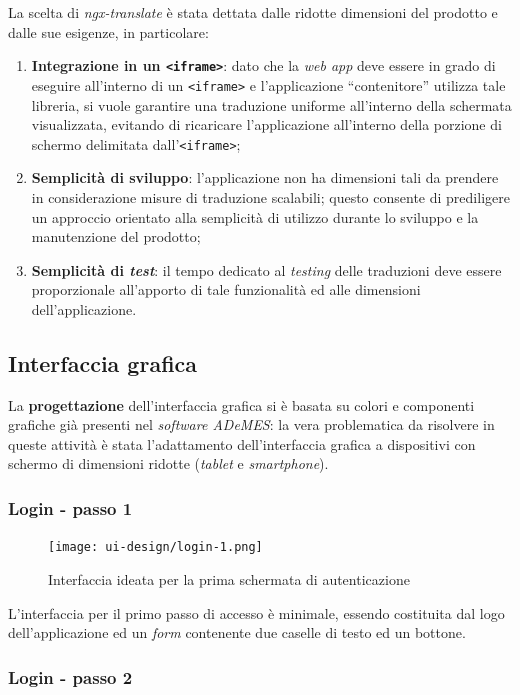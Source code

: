 La scelta di \textit{ngx-translate} è stata dettata dalle ridotte dimensioni del prodotto e dalle sue esigenze, in particolare:
\begin{enumerate}
    \item \textbf{Integrazione in un \texttt{<iframe>}}: dato che la \textit{web app} deve essere in grado di eseguire all’interno di un \texttt{<iframe>} e l’applicazione “contenitore” utilizza tale libreria, si vuole garantire una traduzione
    uniforme all’interno della schermata visualizzata, evitando di ricaricare l’applicazione all’interno della porzione di schermo delimitata dall’\texttt{<iframe>};
    \item \textbf{Semplicità di sviluppo}: l’applicazione non ha dimensioni tali da prendere in considerazione misure di traduzione scalabili; questo consente di prediligere un approccio orientato alla semplicità di utilizzo durante lo sviluppo e la manutenzione del prodotto;
    \item \textbf{Semplicità di \textit{test}}: il tempo dedicato al \textit{testing} delle traduzioni deve essere proporzionale all’apporto di tale funzionalità ed alle dimensioni dell’applicazione.
\end{enumerate}

\subsection{Interfaccia grafica}
La \textbf{progettazione} dell'interfaccia grafica si è basata su colori e componenti grafiche già presenti nel \textit{software ADeMES}: la vera problematica da risolvere in queste attività è stata l'adattamento dell'interfaccia grafica a dispositivi con schermo di dimensioni ridotte (\textit{tablet} e \textit{smartphone}).

\subsubsection*{Login - passo 1}

\begin{figure}[H]
    \centering
    \texttt{[image: ui-design/login-1.png]}
    \caption{Interfaccia ideata per la prima schermata di autenticazione}
\end{figure}
L’interfaccia per il primo passo di accesso è minimale, essendo costituita dal logo dell’applicazione ed un \textit{form} contenente due caselle di testo ed un bottone.

\subsubsection*{Login - passo 2}


